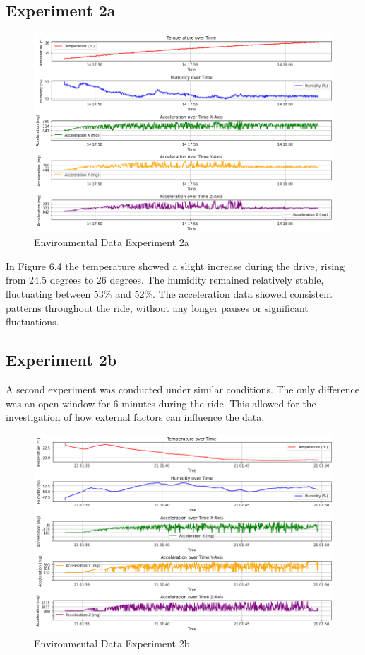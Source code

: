 \subsection{Experiment 2a}

\begin{figure}[H]
\centering
\includegraphics[width=1\linewidth]{plot_exp_2a.png}
\caption{Environmental Data Experiment 2a}
\label{fig:Environmental Data Experiment 2a}
\end{figure}

In Figure 6.4 the temperature showed a slight increase during the drive, rising from 24.5 degrees to 26 degrees. The humidity remained relatively stable, fluctuating between 53\% and 52\%. The acceleration data showed consistent patterns throughout the ride, without any longer pauses or significant fluctuations.

\subsection{Experiment 2b}
A second experiment was conducted under similar conditions. The only difference was an open window for 6 minutes during the ride. This allowed for the investigation of how external factors can influence the data.

\begin{figure}[H]
\centering
\includegraphics[width=1\linewidth]{plot_exp_2b.png}
\caption{Environmental Data Experiment 2b}
\label{fig:Environmental Data Experiment 2b}
\end{figure}


